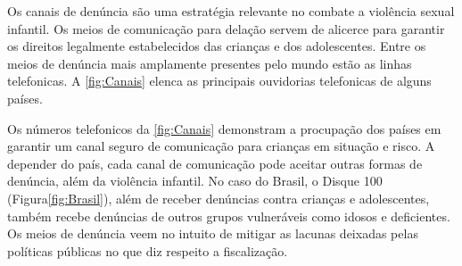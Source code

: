 \begin{figure}
  \vspace{-8pt}
\end{figure}


Os canais de denúncia são uma estratégia relevante no combate a violência sexual infantil. Os meios de comunicação para delação servem de alicerce para garantir os direitos legalmente estabelecidos das crianças e dos adolescentes. Entre os meios de denúncia mais amplamente presentes pelo mundo estão as linhas telefonicas. A \autoref{fig:Canais} elenca as principais ouvidorias telefonicas de alguns países.


Os números telefonicos da \autoref{fig:Canais} demonstram a procupação dos países em garantir um canal seguro de comunicação para crianças em situação e risco. A depender do país, cada canal de comunicação pode aceitar outras formas de denúncia, além da violência infantil. No caso do Brasil, o Disque 100 (Figura\autoref{fig:Brasil}), além de receber denúncias contra crianças e adolescentes, também recebe denúncias de outros grupos vulneráveis como idosos e deficientes. Os meios de denúncia veem no intuito de mitigar as lacunas deixadas pelas políticas públicas no que diz respeito a fiscalização.

